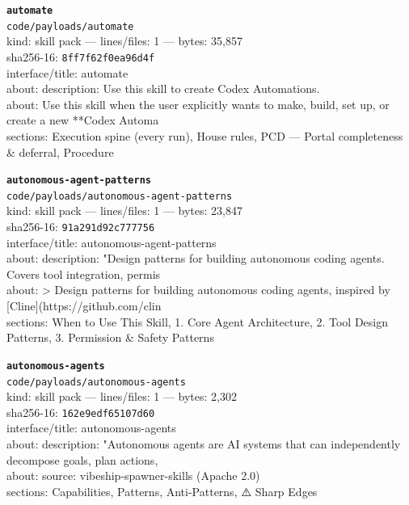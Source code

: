\noindent\textbf{\texttt{automate}}\\
\texttt{code/payloads/automate}\\
kind: skill pack --- lines/files: 1 --- bytes: 35,857\\
sha256-16: \texttt{8ff7f62f0ea96d4f}\\
interface/title: automate\\
about: description: Use this skill to create Codex Automations.\\
about: Use this skill when the user explicitly wants to make, build, set up, or create a new **Codex Automa\\
sections: Execution spine (every run), House rules, PCD — Portal completeness \& deferral, Procedure\\
\vspace*{6.0pt}
\newpage

\noindent\textbf{\texttt{autonomous-agent-patterns}}\\
\texttt{code/payloads/autonomous-agent-patterns}\\
kind: skill pack --- lines/files: 1 --- bytes: 23,847\\
sha256-16: \texttt{91a291d92c777756}\\
interface/title: autonomous-agent-patterns\\
about: description: "Design patterns for building autonomous coding agents. Covers tool integration, permis\\
about: > Design patterns for building autonomous coding agents, inspired by [Cline](https://github.com/clin\\
sections: When to Use This Skill, 1. Core Agent Architecture, 2. Tool Design Patterns, 3. Permission \& Safety Patterns\\
\vspace*{6.0pt}

\noindent\textbf{\texttt{autonomous-agents}}\\
\texttt{code/payloads/autonomous-agents}\\
kind: skill pack --- lines/files: 1 --- bytes: 2,302\\
sha256-16: \texttt{162e9edf65107d60}\\
interface/title: autonomous-agents\\
about: description: "Autonomous agents are AI systems that can independently decompose goals, plan actions,\\
about: source: vibeship-spawner-skills (Apache 2.0)\\
sections: Capabilities, Patterns, Anti-Patterns, ⚠️ Sharp Edges\\
\vspace*{6.0pt}

